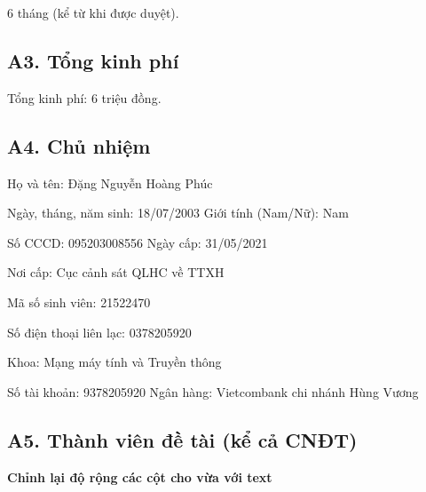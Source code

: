 \documentclass[letterpaper]{article}
\begin{document}
6 tháng (kể từ khi được duyệt).

\subsection{A3. Tổng kinh phí}

\noindent Tổng kinh phí: 6 triệu đồng.



\subsection{A4. Chủ nhiệm}
\begin{spacing}{1.5}

\indent \indent Họ và tên: Đặng Nguyễn Hoàng Phúc\par

Ngày, tháng, năm sinh: 18/07/2003 \hspace{2cm} Giới tính (Nam/Nữ): Nam\par

Số CCCD: 095203008556\hspace{3.5cm} Ngày cấp: 31/05/2021\par Nơi cấp: Cục cảnh sát QLHC về TTXH\par

Mã số sinh viên: 21522470

Số điện thoại liên lạc: 0378205920

Khoa: Mạng máy tính và Truyền thông\par

Số tài khoản: 9378205920\hspace{2cm} Ngân hàng: Vietcombank chi nhánh Hùng Vương
\end{spacing}

\subsection{A5. Thành viên đề tài (kể cả CNĐT)}

\textbf{\color{red}Chỉnh lại độ rộng các cột cho vừa với text}
\end{document}

